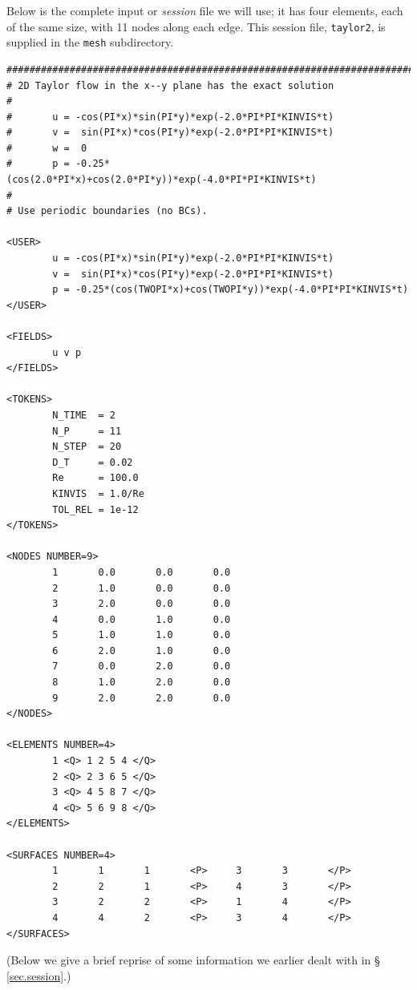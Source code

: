 \documentclass[11pt]{report}
\begin{document}
Below is the complete input or \emph{session} file we will use; it has
four elements, each of the same size, with 11 nodes along each edge.
This session file, \texttt{taylor2}, is supplied in the \verb|mesh|
subdirectory.
%
{\small
\begin{verbatim}
##############################################################################
# 2D Taylor flow in the x--y plane has the exact solution
#
#       u = -cos(PI*x)*sin(PI*y)*exp(-2.0*PI*PI*KINVIS*t)
#       v =  sin(PI*x)*cos(PI*y)*exp(-2.0*PI*PI*KINVIS*t)
#       w =  0
#       p = -0.25*(cos(2.0*PI*x)+cos(2.0*PI*y))*exp(-4.0*PI*PI*KINVIS*t)
#
# Use periodic boundaries (no BCs).

<USER>
        u = -cos(PI*x)*sin(PI*y)*exp(-2.0*PI*PI*KINVIS*t)
        v =  sin(PI*x)*cos(PI*y)*exp(-2.0*PI*PI*KINVIS*t)
        p = -0.25*(cos(TWOPI*x)+cos(TWOPI*y))*exp(-4.0*PI*PI*KINVIS*t)
</USER>

<FIELDS>
        u v p
</FIELDS>

<TOKENS>
        N_TIME  = 2
        N_P     = 11
        N_STEP  = 20
        D_T     = 0.02
        Re      = 100.0
        KINVIS  = 1.0/Re
        TOL_REL = 1e-12
</TOKENS>

<NODES NUMBER=9>
        1       0.0       0.0       0.0
        2       1.0       0.0       0.0
        3       2.0       0.0       0.0
        4       0.0       1.0       0.0
        5       1.0       1.0       0.0
        6       2.0       1.0       0.0
        7       0.0       2.0       0.0
        8       1.0       2.0       0.0
        9       2.0       2.0       0.0
</NODES>

<ELEMENTS NUMBER=4>
        1 <Q> 1 2 5 4 </Q>
        2 <Q> 2 3 6 5 </Q>
        3 <Q> 4 5 8 7 </Q>
        4 <Q> 5 6 9 8 </Q>
</ELEMENTS>

<SURFACES NUMBER=4>
        1       1       1       <P>     3       3       </P>
        2       2       1       <P>     4       3       </P>
        3       2       2       <P>     1       4       </P>
        4       4       2       <P>     3       4       </P>
</SURFACES>
\end{verbatim}
}

(Below we give a brief reprise of some information we earlier dealt
with in \S\,\ref{sec.session}.)
\end{document}

